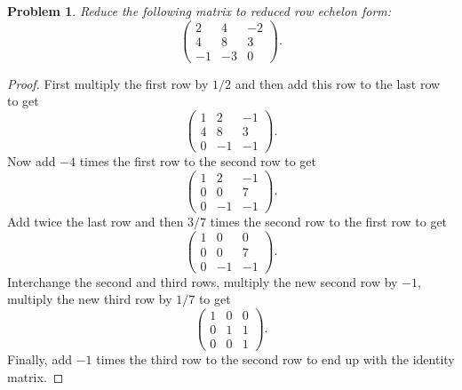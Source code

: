 \documentclass{article}
\newtheorem{problem}{Problem}
\begin{document}

\begin{problem}
Reduce the following matrix to reduced row echelon form:
\[
\left (
\begin{array}{ccc}
2 & 4 & -2\\
4 & 8 & 3\\
-1 & -3 & 0
\end{array}
\right ).
\]
\end{problem}
\begin{proof}
First multiply the first row by $1/2$ and then add this row to the last row to get
\[
\left (
\begin{array}{ccc}
1 & 2 & -1\\
4 & 8 & 3\\
0 & -1 & -1
\end{array}
\right ).
\]
Now add $-4$ times the first row to the second row to get
\[
\left (
\begin{array}{ccc}
1 & 2 & -1\\
0 & 0 & 7\\
0 & -1 & -1
\end{array}
\right ).
\]
Add twice the last row and then $3/7$ times the second row to the first row to get
\[
\left (
\begin{array}{ccc}
1 & 0 & 0\\
0 & 0 & 7\\
0 & -1 & -1
\end{array}
\right ).
\]
Interchange the second and third rows, multiply the new second row by $-1$, multiply the new third row by $1/7$ to get
\[
\left (
\begin{array}{ccc}
1 & 0 & 0\\
0 & 1 & 1\\
0 & 0 & 1
\end{array}
\right ).
\]
Finally, add $-1$ times the third row to the second row to end up with the identity matrix.
\end{proof}
\end{document}
